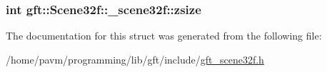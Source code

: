 \hypertarget{structgft_1_1Scene32f_1_1__scene32f_a2edf3aef02f61feb5b316fc0ee3db854}{
\subsubsection[{zsize}]{\setlength{\rightskip}{0pt plus 5cm}int gft\-::\-Scene32f\-::\-\_\-scene32f\-::zsize}}\label{structgft_1_1Scene32f_1_1__scene32f_a2edf3aef02f61feb5b316fc0ee3db854}


The documentation for this struct was generated from the following file\-:\begin{DoxyCompactItemize}
\item 
/home/pavm/programming/lib/gft/include/\hyperlink{gft__scene32f_8h}{gft\-\_\-scene32f.\-h}\end{DoxyCompactItemize}
